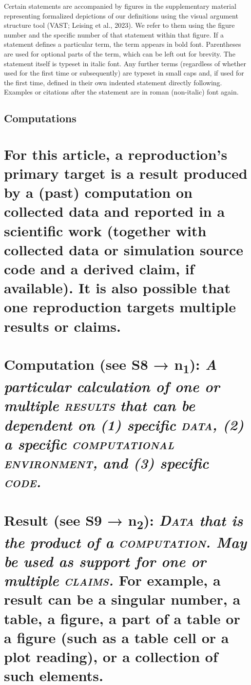 \documentclass[authordate, empirical]{jote-new-article}
\begin{document}
	Certain statements are accompanied by figures in the supplementary material representing formalized depictions of our definitions using the visual argument structure tool (VAST; Leising et al., 2023). We refer to them using the figure number and the specific number of that statement within that figure. If a statement defines a particular term, the term appears in bold font. Parentheses are used for optional parts of the term, which can be left out for brevity. The statement itself is typeset in italic font. Any further terms (regardless of whether used for the first time or subsequently) are typeset in small caps and, if used for the first time, defined in their own indented statement directly following. Examples or citations after the statement are in roman (non-italic) font again.



	\subsection{Computations}



	\section{For this article, a reproduction's primary target is a result produced by a (past) computation on collected data and reported in a scientific work (together with collected data or simulation source code and a derived claim, if available). It is also possible that one reproduction targets multiple results or claims.}



	\section{\textbf{Computation} (see S8 → n\textsubscript{1}): \emph{A particular calculation of one or multiple }\textsc{\emph{results}}\emph{ that can be dependent on (1) specific }\textsc{\emph{data}}\emph{, (2) a specific }\textsc{\emph{computational environment,}}\emph{ and (3) specific }\textsc{\emph{code}}\emph{.}}



	\section{\textbf{Result} (see S9 → n\textsubscript{2}): \textsc{\emph{Data}}\emph{ that is the product of a }\textsc{\emph{computation}}\emph{. May be used as support for one or multiple }\textsc{\emph{claims.}} For example, a result can be a singular number, a table, a figure, a part of a table or a figure (such as a table cell or a plot reading), or a collection of such elements.}
\end{document}
